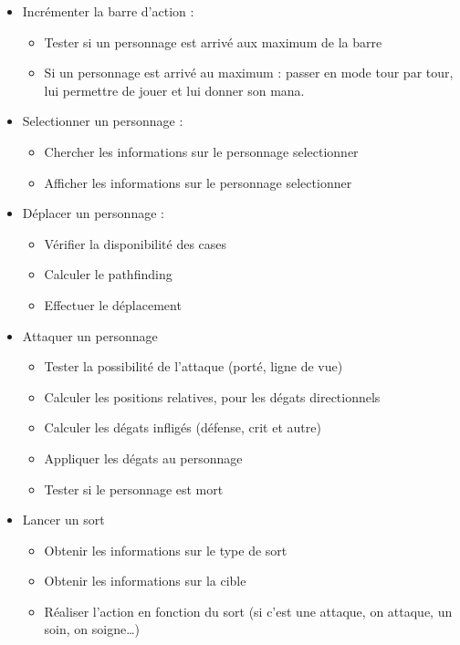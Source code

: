 \documentclass[a4paper,12pt]{article}
\begin{document}
\begin{itemize}
  \item Incrémenter la barre d'action :
  \begin{itemize}
    \item Tester si un personnage est arrivé aux maximum de la barre
    \item Si un personnage est arrivé au maximum : passer en mode tour par tour,
    lui permettre de jouer et lui donner son mana.
  \end{itemize}
  \item Selectionner un personnage :
  \begin{itemize}
    \item Chercher les informations sur le personnage selectionner
    \item Afficher les informations sur le personnage selectionner
  \end{itemize}
  \item Déplacer un personnage :
  \begin{itemize}
    \item Vérifier la disponibilité des cases 
    \item Calculer le pathfinding
    \item Effectuer le déplacement
  \end{itemize}
  \item Attaquer un personnage
  \begin{itemize}
    \item Tester la possibilité de l'attaque (porté, ligne de vue)
    \item Calculer les positions relatives, pour les dégats directionnels
    \item Calculer les dégats infligés (défense, crit et autre)
    \item Appliquer les dégats au personnage
    \item Tester si le personnage est mort
  \end{itemize}
  \item Lancer un sort
  \begin{itemize}
    \item Obtenir les informations sur le type de sort
    \item Obtenir les informations sur la cible 
    \item Réaliser l'action en fonction du sort (si c'est une attaque, on attaque, un soin, on soigne\dots)
  \end{itemize}
\end{itemize}
\end{document}
